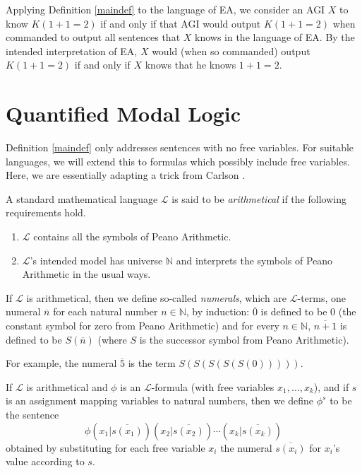 \documentclass[runningheads]{llncs}
\begin{document}
\begin{example}
Applying Definition \ref{maindef} to the language of EA,
we consider an AGI $X$ to know $K(1+1=2)$ if and only if that AGI would output
$K(1+1=2)$ when commanded to output all sentences that $X$ knows in the language of
EA. By the intended interpretation of
EA, $X$ would (when so commanded)
output $K(1+1=2)$ if and only if $X$ knows that he knows $1+1=2$.
\end{example}

\section{Quantified Modal Logic}
\label{quantifiedsection}

Definition \ref{maindef} only addresses sentences with no free variables.
For suitable languages, we will extend this to formulas which possibly include
free variables. Here, we are essentially adapting a trick from
Carlson \cite{carlson}.

\begin{definition}
  A standard mathematical language $\mathscr L$ is said to be \emph{arithmetical}
  if the following requirements hold.
  \begin{enumerate}
    \item $\mathscr L$ contains all the symbols of Peano Arithmetic.
    \item $\mathscr L$'s intended model has universe $\mathbb N$ and interprets
    the symbols of Peano Arithmetic in the usual ways.
  \end{enumerate}
\end{definition}

\begin{definition}
  If $\mathscr L$ is arithmetical, then we define so-called \emph{numerals}, which
  are $\mathscr L$-terms, one numeral $\overline n$ for each natural number $n\in\mathbb N$,
  by induction: $\overline 0$ is defined to be $0$ (the constant symbol for zero from
  Peano Arithmetic) and
  for every $n\in\mathbb N$, $\overline{n+1}$ is defined to be $S(\overline n)$
  (where $S$ is the successor symbol from Peano Arithmetic).
\end{definition}

For example, the numeral $\overline 5$ is the term $S(S(S(S(S(0)))))$.

\begin{definition}
  If $\mathscr L$ is arithmetical and $\phi$ is an $\mathscr L$-formula (with free variables
  $x_1,\ldots,x_k$),
  and if $s$ is an assignment mapping variables to natural numbers, then we define $\phi^s$
  to be the sentence
  \[
    \phi(x_1|\overline{s(x_1)})(x_2|\overline{s(x_2)})\cdots (x_k|\overline{s(x_k)})
  \]
  obtained by substituting for each free variable $x_i$ the numeral $\overline{s(x_i)}$
  for $x_i$'s value according to $s$.
\end{definition}
\end{document}
